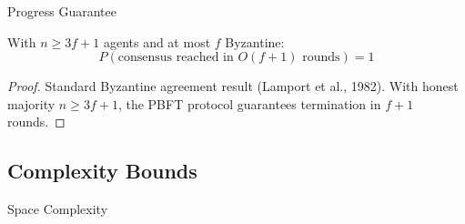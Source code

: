 \documentclass[
  ignorenonframetext,
]{beamer}
\begin{document}
\begin{frame}[allowframebreaks]{Progress Guarantee}
\protect{}\label{sec:progress-guarantee}
\begin{theorem}
\label{thm:byzantine-termination}
With $n \geq 3f + 1$ agents and at most $f$ Byzantine:
\begin{equation}
\label{eq:consensus-termination}
P(\text{consensus reached in } O(f+1) \text{ rounds}) = 1
\end{equation}
\end{theorem}

\begin{proof}
Standard Byzantine agreement result (Lamport et al., 1982). With honest majority $n \geq 3f + 1$, the PBFT protocol guarantees termination in $f+1$ rounds.
\end{proof}
\end{frame}

\subsection{Complexity Bounds}\label{sec:complexity-bounds}

\begin{frame}[allowframebreaks]{Space Complexity}
\protect{}\label{sec:space-complexity}
\end{frame}
\end{document}
